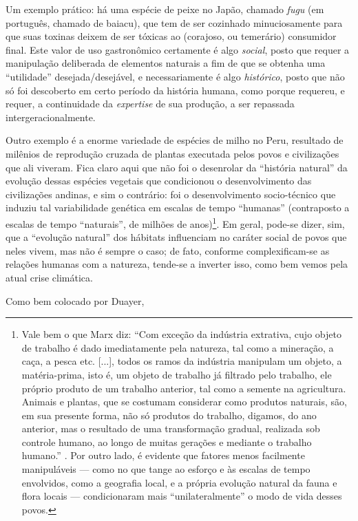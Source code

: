 \documentclass[12pt]{article}
\begin{document}
Um exemplo prático: há uma espécie de peixe no Japão, chamado \textit{fugu} (em português, chamado de baiacu), que tem de ser cozinhado minuciosamente para que suas toxinas deixem de ser tóxicas ao (corajoso, ou temerário) consumidor final. Este valor de uso gastronômico certamente é algo \textit{social}, posto que requer a manipulação deliberada de elementos naturais a fim de que se obtenha uma ``utilidade'' desejada/desejável, e necessariamente é algo \textit{histórico}, posto que não só foi descoberto em certo período da história humana, como porque requereu, e requer, a continuidade da \textit{expertise} de sua produção, a ser repassada intergeracionalmente.

Outro exemplo é a enorme variedade de espécies de milho no Peru, resultado de milênios de reprodução cruzada de plantas executada pelos povos e civilizações que ali viveram. Fica claro aqui que não foi o desenrolar da ``história natural'' da evolução dessas espécies vegetais que condicionou o desenvolvimento das civilizações andinas, e sim o contrário: foi o desenvolvimento socio-técnico que induziu tal variabilidade genética em escalas de tempo ``humanas'' (contraposto a escalas de tempo ``naturais'', de milhões de anos)\footnote{Vale bem o que Marx diz: ``Com exceção da indústria extrativa, cujo objeto de trabalho é dado imediatamente pela natureza, tal como a mineração, a caça, a pesca etc. [...], todos os ramos da indústria manipulam um objeto, a matéria-prima, isto é, um objeto de trabalho já filtrado pelo trabalho, ele próprio produto de um trabalho anterior, tal como a semente na agricultura. Animais e plantas, que se costumam considerar como produtos naturais, são, em sua presente forma, não só produtos do trabalho, digamos, do ano anterior, mas o resultado de uma transformação gradual, realizada sob controle humano, ao longo de muitas gerações e mediante o trabalho humano.'' \cite[p. 259]{Marx2017a}. Por outro lado, é evidente que fatores menos facilmente manipuláveis --- como no que tange ao esforço e às escalas de tempo envolvidos, como a geografia local, e a própria evolução natural da fauna e flora locais --- condicionaram mais ``unilateralmente'' o modo de vida desses povos.}. Em geral, pode-se dizer, sim, que a ``evolução natural'' dos hábitats influenciam no caráter social de povos que neles vivem, mas não é sempre o caso; de fato, conforme complexificam-se as relações humanas com a natureza, tende-se a inverter isso, como bem vemos pela atual crise climática.

Como bem colocado por Duayer,
\end{document}
